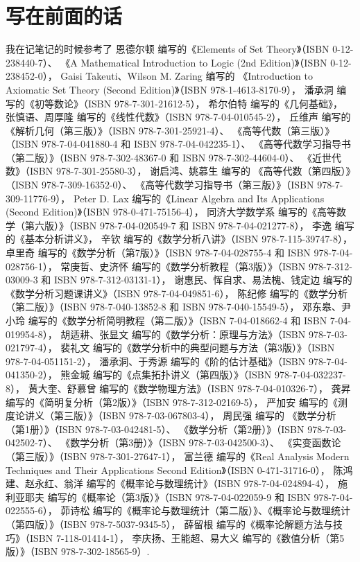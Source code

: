 \chapter*{写在前面的话}
我在记笔记的时候参考了
恩德尔顿 编写的《Elements of Set Theory》（ISBN 0-12-238440-7）、
《A Mathematical Introduction to Logic (2nd Edition)》（ISBN 0-12-238452-0），
Gaisi Takeuti、Wilson M. Zaring 编写的
《Introduction to Axiomatic Set Theory (Second Edition)》（ISBN 978-1-4613-8170-9），
潘承洞 编写的《初等数论》（ISBN 978-7-301-21612-5），
希尔伯特 编写的《几何基础》，
张慎语、周厚隆 编写的《线性代数》（ISBN 978-7-04-010545-2），
丘维声 编写的
《解析几何（第三版）》（ISBN 978-7-301-25921-4）、
《高等代数（第三版）》（ISBN 978-7-04-041880-4 和 ISBN 978-7-04-042235-1）、
《高等代数学习指导书（第二版）》（ISBN 978-7-302-48367-0 和 ISBN 978-7-302-44604-0）、
《近世代数》（ISBN 978-7-301-25580-3），
谢启鸿、姚慕生 编写的
《高等代数（第四版）》（ISBN 978-7-309-16352-0）、
《高等代数学习指导书（第三版）》（ISBN 978-7-309-11776-9），
Peter D. Lax 编写的《Linear Algebra and Its Applications (Second Edition)》（ISBN 978-0-471-75156-4），
同济大学数学系 编写的《高等数学（第六版）》（ISBN 978-7-04-020549-7 和 ISBN 978-7-04-021277-8），
李逸 编写的《基本分析讲义》，
辛钦 编写的《数学分析八讲》（ISBN 978-7-115-39747-8），
卓里奇 编写的《数学分析（第7版）》（ISBN 978-7-04-028755-4 和 ISBN 978-7-04-028756-1），
常庚哲、史济怀 编写的《数学分析教程（第3版）》（ISBN 978-7-312-03009-3 和 ISBN 978-7-312-03131-1），
谢惠民、恽自求、易法槐、钱定边 编写的《数学分析习题课讲义》（ISBN 978-7-04-049851-6），
陈纪修 编写的《数学分析（第二版）》（ISBN 978-7-040-13852-8 和 ISBN 978-7-040-15549-5），
邓东皋、尹小玲 编写的《数学分析简明教程（第二版）》（ISBN 7-04-018662-4 和 ISBN 7-04-019954-8），
胡适耕、张显文 编写的《数学分析：原理与方法》（ISBN 978-7-03-021797-4），
裴礼文 编写的《数学分析中的典型问题与方法（第3版）》（ISBN 978-7-04-051151-2），
潘承洞、于秀源 编写的《阶的估计基础》（ISBN 978-7-04-041350-2），
熊金城 编写的《点集拓扑讲义（第四版）》（ISBN 978-7-04-032237-8），
黄大奎、舒慕曾 编写的《数学物理方法》（ISBN 978-7-04-010326-7），
龚昇 编写的《简明复分析（第2版）》（ISBN 978-7-312-02169-5），
严加安 编写的《测度论讲义（第三版）》（ISBN 978-7-03-067803-4），
周民强 编写的
《数学分析（第1册）》（ISBN 978-7-03-042481-5）、
《数学分析（第2册）》（ISBN 978-7-03-042502-7）、
《数学分析（第3册）》（ISBN 978-7-03-042500-3）、
《实变函数论（第三版）》（ISBN 978-7-301-27647-1），
富兰德 编写的《Real Analysis Modern Techniques and Their Applications Second Edition》（ISBN 0-471-31716-0），
陈鸿建、赵永红、翁洋 编写的《概率论与数理统计》（ISBN 978-7-04-024894-4），
施利亚耶夫 编写的《概率论（第3版）》（ISBN 978-7-04-022059-9 和 ISBN 978-7-04-022555-6），
茆诗松 编写的《概率论与数理统计（第二版）》、《概率论与数理统计（第四版）》（ISBN 978-7-5037-9345-5），
薛留根 编写的《概率论解题方法与技巧》（ISBN 7-118-01414-1），
李庆扬、王能超、易大义 编写的《数值分析（第5版）》（ISBN 978-7-302-18565-9）.

